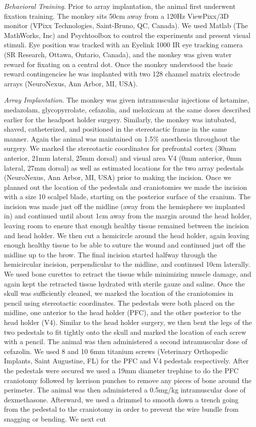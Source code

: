 \textit{Behavioral Training}. Prior to array implantation, the animal first underwent fixation training. The monkey sits 50cm away from a 120Hz ViewPixx/3D monitor (VPixx Technologies, Saint-Bruno, QC, Canada). We used Matlab (The MathWorks, Inc) and Psychtoolbox to control the experiments and present visual stimuli. Eye position was tracked with an Eyelink 1000 IR eye tracking camera (SR Research, Ottawa, Ontario, Canada), and the monkey was given water reward for fixating on a central dot. Once the monkey understood the basic reward contingencies he was implanted with two 128 channel matrix electrode arrays (NeuroNexus, Ann Arbor, MI, USA).

\textit{Array Implantation}. The monkey was given intramuscular injections of ketamine, medazolam, glycopyrrolate, cefazolin, and meloxicam at the same doses described earlier for the headpost holder surgery. Similarly, the monkey was intubated, shaved, catheterized, and positioned in the stereotactic frame in the same manner. Again the animal was maintained on 1.5\% anesthesia throughout the surgery. We marked the stereotactic coordinates for prefrontal cortex (30mm anterior, 21mm lateral, 25mm dorsal) and visual area V4 (0mm anterior, 0mm lateral, 27mm dorsal) as well as estimated locations for the two array pedestals (NeuroNexus, Ann Arbor, MI, USA) prior to making the incision. Once we planned out the location of the pedestals and craniotomies we made the incision with a size 10 scalpel blade, starting on the posterior surface of the cranium. The incision was made just off the midline (away from the hemisphere we implanted in) and continued until about 1cm away from the margin around the head holder, leaving room to ensure that enough healthy tissue remained between the incision and head holder. We then cut a hemicircle around the head holder, again leaving enough healthy tissue to be able to suture the wound and continued just off the midline up to the brow. The final incision started halfway through the hemicircular incision, perpendicular to the midline, and continued 10cm laterally. We used bone curettes to retract the tissue while minimizing muscle damage, and again kept the retracted tissue hydrated with sterile gauze and saline. Once the skull was sufficiently cleaned, we marked the location of the craniotomies in pencil using stereotactic coordinates. The pedestals were both placed on the midline, one anterior to the head holder (PFC), and the other posterior to the head holder (V4). Similar to the head holder surgery, we then bent the legs of the two pedestals to fit tightly onto the skull and marked the location of each screw with a pencil. The animal was then administered a second intramuscular dose of cefazolin. We used 8 and 10 6mm titanium screws (Veterinary Orthopedic Implants, Saint Augustine, FL) for the PFC and V4 pedestals respectively. After the pedestals were secured we used a 19mm diameter trephine to do the PFC craniotomy followed by kerrison punches to remove any pieces of bone around the perimeter. The animal was then administered a 0.5mg/kg intramuscular dose of dexmethasone. Afterward, we used a drimmel to smooth down a trench going from the pedestal to the craniotomy in order to prevent the wire bundle from snagging or bending. We next cut 
